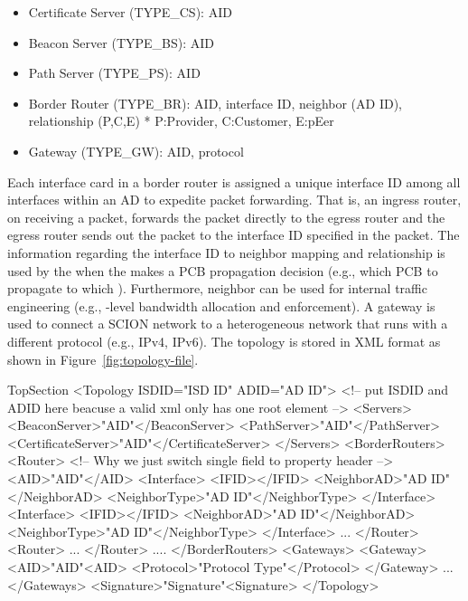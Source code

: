 \begin{itemize}
\item Certificate Server (TYPE\_CS): AID 
\item Beacon Server (TYPE\_BS): AID
\item Path Server (TYPE\_PS): AID
\item Border Router (TYPE\_BR): AID, interface ID, neighbor \AD (AD ID), \AD relationship (P,C,E)\newline
	* P:Provider, C:Customer, E:pEer
\item Gateway (TYPE\_GW): AID, protocol 
\end{itemize}
Each interface card in a border router is assigned a unique interface ID among all interfaces within an AD to expedite packet forwarding. That is, an ingress router, on receiving a packet, forwards the packet directly to the egress router and the egress router sends out the packet to the interface ID specified in the packet. The information regarding the interface ID to neighbor \AD mapping and \AD relationship is used by the \BS when the \BS makes a PCB propagation decision (e.g., which PCB to propagate to which \AD). Furthermore, neighbor \AD can be used for internal traffic engineering (e.g., \AD-level bandwidth allocation and enforcement). A gateway is used to connect a SCION network to a heterogeneous network that runs with a different protocol (e.g., IPv4, IPv6). 
The \AD topology is stored in XML format as shown in Figure~\ref{fig:topology-file}.


\begin{SaveVerbatim}{TopSection}
<Topology ISDID="ISD ID" ADID="AD ID">	
<!-- put ISDID and ADID here beacuse a valid xml only has one root element -->
	<Servers>
		<BeaconServer>"AID"</BeaconServer>
		<PathServer>"AID"</PathServer>
		<CertificateServer>"AID"</CertificateServer>
	</Servers>
	<BorderRouters>
		<Router>	
		<!-- Why we just switch single field to property header -->
			<AID>"AID"</AID>
			<Interface>
				<IFID></IFID>
				<NeighborAD>"AD ID"</NeighborAD>
				<NeighborType>"AD ID"</NeighborType>
			</Interface>
			<Interface>
				<IFID></IFID>
				<NeighborAD>"AD ID"</NeighborAD>
				<NeighborType>"AD ID"</NeighborType>
			</Interface>
				...
		</Router>
		<Router>
			...
		</Router>
			....
	</BorderRouters>
	<Gateways>
		<Gateway>
			<AID>"AID"<AID>
			<Protocol>"Protocol Type"</Protocol>
		</Gateway>
			...
	</Gateways>
	<Signature>"Signature"<Signature>
</Topology>
\end{SaveVerbatim}

